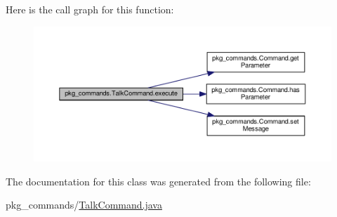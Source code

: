 Here is the call graph for this function\-:
\nopagebreak
\begin{figure}[H]
\begin{center}
\leavevmode
\includegraphics[width=350pt]{classpkg__commands_1_1TalkCommand_a413573388e24a2d442f9814695f7e47c_cgraph}
\end{center}
\end{figure}




The documentation for this class was generated from the following file\-:\begin{DoxyCompactItemize}
\item 
pkg\-\_\-commands/\hyperlink{TalkCommand_8java}{Talk\-Command.\-java}\end{DoxyCompactItemize}
